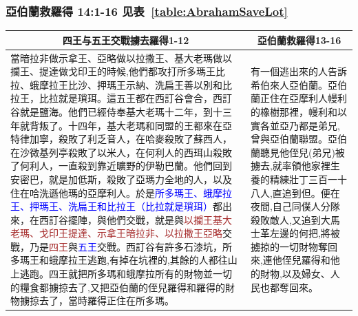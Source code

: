 \subsubsection{亞伯蘭救羅得 14:1-16 见表~\ref{table:AbrahamSaveLot}}
\noindent 
\begin{table}[H]
\centering
\begin{tabular}{p{12.5cm}|p{4.5cm}}\hline\hline
\multicolumn{1}{c|}{四王与五王交戰擄去羅得1-12}&\multicolumn{1}{c}{亞伯蘭救羅得13-16}\\\hline
當暗拉非做示拿王、亞略做以拉撒王、基大老瑪做以攔王、提達做戈印王的時候,他們都攻打所多瑪王比拉、蛾摩拉王比沙、押瑪王示納、洗扁王善以別和比拉王，比拉就是瑣珥。這五王都在西訂谷會合，西訂谷就是鹽海。他們已經侍奉基大老瑪十二年，到十三年就背叛了。十四年，基大老瑪和同盟的王都來在亞特律加寧，殺敗了利乏音人，在哈麥殺敗了蘇西人，在沙微基列亭殺敗了以米人，在何利人的西珥山殺敗了何利人，一直殺到靠近曠野的伊勒巴蘭。他們回到安密巴，就是加低斯，殺敗了亞瑪力全地的人，以及住在哈洗遜他瑪的亞摩利人。於是\textcolor{blue}{所多瑪王、蛾摩拉王、押瑪王、洗扁王和比拉王（比拉就是瑣珥）}都出來，在西訂谷擺陣，與他們交戰，就是與\textcolor{brown}{以攔王基大老瑪、戈印王提達、示拿王暗拉非、以拉撒王亞略}交戰，乃是\textcolor{brown}{四王}與\textcolor{blue}{五王}交戰。西訂谷有許多石漆坑，所多瑪王和蛾摩拉王逃跑,有掉在坑裡的,其餘的人都往山上逃跑。四王就把所多瑪和蛾摩拉所有的財物並一切的糧食都擄掠去了,又把亞伯蘭的侄兒羅得和羅得的財物擄掠去了，當時羅得正住在所多瑪。
&有一個逃出來的人告訴希伯來人亞伯蘭。亞伯蘭正住在亞摩利人幔利的橡樹那裡，幔利和以實各並亞乃都是弟兄,曾與亞伯蘭聯盟。亞伯蘭聽見他侄兒(弟兄)被擄去,就率領他家裡生養的精練壯丁三百一十八人,直追到但。便在夜間,自己同僕人分隊殺敗敵人,又追到大馬士革左邊的何把,將被擄掠的一切財物奪回來,連他侄兒羅得和他的財物,以及婦女、人民也都奪回來。\\\hline
\end{tabular}
\end{table}


